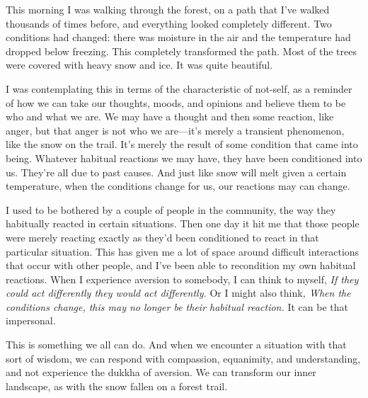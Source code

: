 
This morning I was walking through the forest, on a path that I've 
walked thousands of times before, and everything looked completely 
different. Two conditions had changed: there was moisture in the air 
and the temperature had dropped below freezing. This completely 
transformed the path. Most of the trees were covered with heavy snow 
and ice. It was quite beautiful.

I was contemplating this in terms of the characteristic of not-self, as 
a reminder of how we can take our thoughts, moods, and opinions and 
believe them to be who and what we are. We may have a thought and then 
some reaction, like anger, but that anger is not who we are---it's 
merely a transient phenomenon, like the snow on the trail. It's merely 
the result of some condition that came into being. Whatever habitual 
reactions we may have, they have been conditioned into us. They're all 
due to past causes. And just like snow will melt given a certain 
temperature, when the conditions change for us, our reactions may can 
change.

I used to be bothered by a couple of people in the community, the way 
they habitually reacted in certain situations. Then one day it hit me 
that those people were merely reacting exactly as they'd been 
conditioned to react in that particular situation. This has given me a 
lot of space around difficult interactions that occur with other 
people, and I've been able to recondition my own habitual reactions. 
When I experience aversion to somebody, I can think to myself, \emph{If 
they could act differently they would act differently. }Or I might also 
think\emph{, When the conditions change, this may no longer be their 
habitual reaction. }It can be that impersonal.

This is something we all can do. And when we encounter a situation with 
that sort of wisdom, we can respond with compassion, equanimity, and 
understanding, and not experience the dukkha of aversion. We can 
transform our inner landscape, as with the snow fallen on a forest 
trail.

